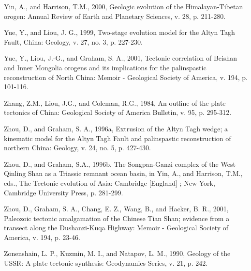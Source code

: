 \documentclass{article}
\begin{document}
\begin{description}
 \item Yin,  A., and Harrison,  T.M., 2000, Geologic evolution  of the
 Himalayan-Tibetan  orogen:  Annual  Review  of  Earth  and  Planetary
 Sciences, v. 28, p. 211-280.\\

 \item Yue, Y.,  and Liou, J. G., 1999,  Two-stage evolution model for
 the Altyn Tagh Fault, China: Geology, v. 27, no. 3, p. 227-230.\\

 \item  Yue,  Y., Liou,  J.-G.,  and  Graham,  S. A.,  2001,  Tectonic
 correlation   of  Beishan   and  Inner   Mongolia  orogens   and  its
 implications  for  the palinspastic  reconstruction  of North  China:
 Memoir - Geological Society of America, v. 194, p. 101-116.\\

 \item Zhang, Z.M., Liou, J.G., and Coleman, R.G., 1984, An outline of
 the plate tectonics of China: Geological Society of America Bulletin,
 v. 95, p. 295-312.\\

 \item Zhou, D., and Graham, S. A., 1996a, Extrusion of the Altyn Tagh
 wedge; a  kinematic model for  the Altyn Tagh Fault  and palinspastic
 reconstruction   of  northern   China:   Geology,  v.   24,  no.   5,
 p. 427-430.\\

 \item Zhou, D., and Graham, S.A., 1996b, The Songpan-Ganzi complex of
 the West Qinling Shan as a  Triassic remnant ocean basin, in Yin, A.,
 and Harrison,  T.M., eds., The Tectonic evolution  of Asia: Cambridge
 [England] ; New York, Cambridge University Press, p. 281-299.\\

 \item Zhou,  D., Graham, S. A.,  Chang, E. Z., Wang,  B., and Hacker,
 B.  R., 2001,  Paleozoic tectonic  amalgamation of  the  Chinese Tian
 Shan;  evidence  from a  transect  along  the Dushanzi-Kuqa  Highway:
 Memoir - Geological Society of America, v. 194, p. 23-46.\\

 \item Zonenshain,  L. P.,  Kuzmin, M. I.,  and Natapov, L.  M., 1990,
 Geology of the USSR:  A plate tectonic synthesis: Geodynamics Series,
 v. 21, p. 242.\\

 \end{description}
\end{document}
